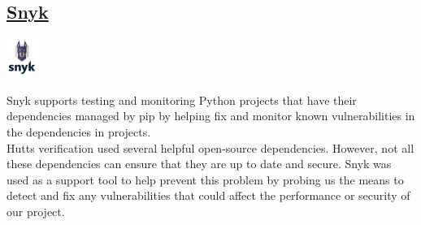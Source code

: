 \documentclass{article}
\begin{document}
		\cleardoublepage
		\begin{minipage}[b]{0.20\linewidth}
			\subsection{\href{https://snyk.io}{Snyk}}
			\vspace{5mm}
		\end{minipage}
		\begin{minipage}[b]{0.80\linewidth}
			\includegraphics[width=1.0cm]{img/snyk.png}
		\end{minipage}
		Snyk supports testing and monitoring Python projects that have their dependencies
		managed by pip by helping fix and monitor known vulnerabilities in the dependencies in projects.\\

		\noindent
		Hutts verification used several helpful open-source dependencies. However, not all these
		dependencies can ensure that they are up to date and secure.
	    Snyk was used as a support tool to help prevent this problem by probing us the means
	    to detect and fix any vulnerabilities that could affect the performance or security of our project.


	
	\cleardoublepage
\end{document}
